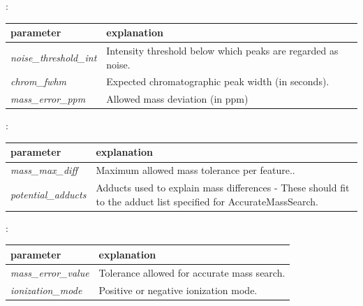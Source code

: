 \noindent{}:
\begin{center}
\begin{tabular*}{\textwidth}{ p{5.5cm}|p{10.5cm} }
\textbf{parameter} & \textbf{explanation} \\ \hline
\textit{noise\_threshold\_int} & Intensity threshold below which peaks are regarded as noise. \\
\textit{chrom\_fwhm} & Expected chromatographic peak width (in seconds). \\
\textit{mass\_error\_ppm} & Allowed mass deviation (in ppm) \\
\end{tabular*}
\end{center}

\noindent{}:
\begin{center}
\begin{tabular*}{\textwidth}{ p{5.5cm}|p{10.5cm} }
\textbf{parameter} & \textbf{explanation} \\ \hline
\textit{mass\_max\_diff} & Maximum allowed mass tolerance per feature.. \\
\textit{potential\_adducts} & Adducts used to explain mass differences - These should fit to the adduct list specified for AccurateMassSearch. \\
\end{tabular*}
\end{center}

\noindent{}:
\begin{center}
\begin{tabular*}{\textwidth}{ p{5.5cm}|p{10.5cm} }
\textbf{parameter} & \textbf{explanation} \\ \hline
\textit{mass\_error\_value} & Tolerance allowed for accurate mass search. \\
\textit{ionization\_mode} &  Positive or negative ionization mode. \\
\end{tabular*}
\end{center}

